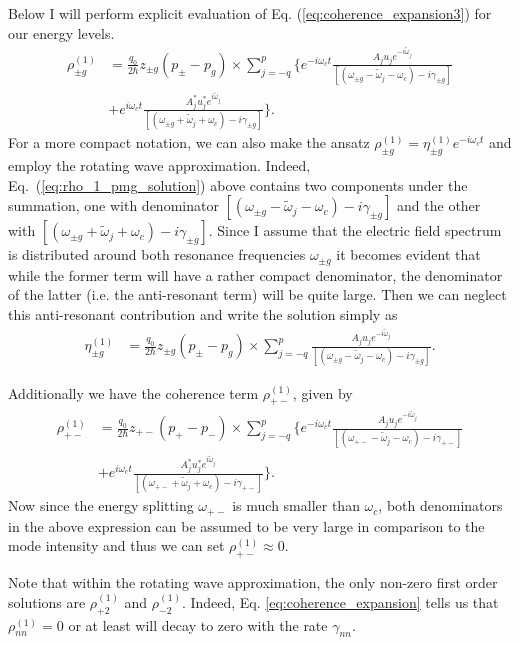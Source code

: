 \documentclass[preprint,secnumarabic,amssymb, nobibnotes, aip, prd]{revtex4-1}
\def\tw{\tilde{\omega}}
\def\tw{\tilde{\omega}}
\begin{document}
	Below I will perform explicit evaluation of Eq. (\ref{eq:coherence_expansion3}) for our energy levels. 
	\begin{align}
	\label{eq:rho_1_pmg_solution}
	\rho_{\pm g}^{(1)} &= \frac{q_0}{2\hbar}z_{\pm g}(p_\pm-p_g)\times \sum_{j=-q}^{p} \Big \{e^{-i\omega_c t}\frac{A_ju_j e^{-i\tw_j}}{[( \omega_{\pm g} - \tw_j-\omega_c) -i\gamma_{\pm g}]} \nonumber \\
	&+e^{i\omega_c t}\frac{A_j^*u_j^* e^{i\tw_j}}{[( \omega_{\pm g} + \tw_j+\omega_c) -i\gamma_{\pm g}]}
	\Big \}.
	\end{align}
	For a more compact notation, we can also make the ansatz $\rho_{\pm g}^{(1)} = \eta_{\pm g}^{(1)}e^{-i\omega_c t}$ and employ the rotating wave approximation. Indeed, Eq.~(\ref{eq:rho_1_pmg_solution}) above contains two components under the summation, one with denominator $[( \omega_{\pm g} - \tw_j-\omega_c) -i\gamma_{\pm g}]$ and the other with $[( \omega_{\pm g} + \tw_j+\omega_c) -i\gamma_{\pm g}]$. Since I assume that the electric field spectrum is distributed around both resonance frequencies $\omega_{\pm g}$ it becomes evident that while the former term will have a rather compact denominator, the denominator of the latter (i.e. the anti-resonant term) will be quite large. Then we can neglect this anti-resonant contribution and write the solution simply as
	\begin{align}
	\label{eq:eta_1_pmg_solution}
	\eta_{\pm g}^{(1)} &= \frac{q_0}{2\hbar}z_{\pm g}(p_\pm-p_g)\times \sum_{j=-q}^{p} \frac{A_ju_j e^{-i\tw_j}}{[( \omega_{\pm g} - \tw_j-\omega_c) -i\gamma_{\pm g}]}.
	\end{align}
	
	Additionally we  have the coherence term $\rho_{+-}^{(1)}$, given by
	\begin{align}
	\label{eq:rho_1_pm_solution}
	\rho_{+-}^{(1)} &= \frac{q_0}{2\hbar}z_{+-}(p_+-p_-)\times \sum_{j=-q}^{p} \Big \{e^{-i\omega_c t}\frac{A_ju_j e^{-i\tw_j}}{[( \omega_{+-} - \tw_j-\omega_c) -i\gamma_{+-}]} \nonumber \\
	&+e^{i\omega_c t}\frac{A_j^*u_j^* e^{i\tw_j}}{[( \omega_{+-} + \tw_j+\omega_c) -i\gamma_{+-}]}
	\Big \}.
	\end{align}
	Now since the energy splitting $\omega_{+-}$ is much smaller than $\omega_c$, both denominators in the above expression can be assumed to be very large in comparison to the mode intensity and thus we can set $\rho_{+-}^{(1)} \approx 0$.
	
	
	Note that within the rotating wave approximation, the only non-zero first order solutions are $\rho_{+2}^{(1)}$ and $\rho_{-2}^{(1)}$. Indeed, Eq. \ref{eq:coherence_expansion} tells us that $\rho_{nn}^{(1)} = 0 $ or at least will decay to zero with the rate $\gamma_{nn}$.
	
\end{document}
